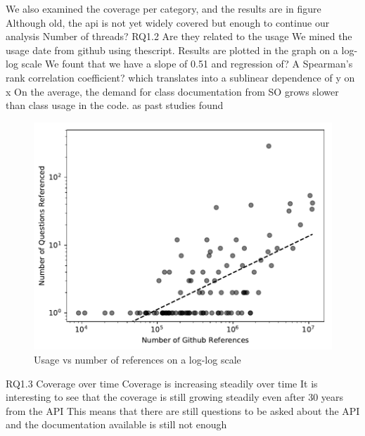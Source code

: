 We also examined the coverage per category, and the results are in figure
Although old, the api is not yet widely covered
but enough to continue our analysis
Number of threads? %
RQ1.2
Are they related to the usage
We mined the usage date from github using thescript.
Results are plotted in the graph on a log-log scale
We fount that we have a slope of 0.51 and regression of? %
A Spearman’s rank correlation coefficient?
which translates into a sublinear dependence of y on x
On the average, the demand for class documentation from SO grows slower
than class usage in the code. as past studies found


\begin{figure}
  \includegraphics{scripts/figures/1-2-usage-vs-coverage}
  \caption{Usage vs number of references on a log-log scale}
  \label{fig:usageref}
\end{figure}

RQ1.3
Coverage over time
Coverage is increasing steadily over time
It is interesting to see that the coverage is still growing steadily even after 30 years from the API
This means that there are still questions to be asked about the API and the documentation available is still not enough

